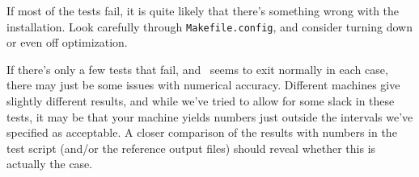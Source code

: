 If most of the tests fail, it is quite likely that there's something
wrong with the installation. Look carefully through
\verb|Makefile.config|, and consider turning down or even off
optimization.

If there's only a few tests that fail, and \dalton\ seems to exit
normally in each case, there may just be some issues with numerical
accuracy. Different machines give slightly different results, and
while we've tried to allow for some slack in these tests, it may be
that your machine yields numbers just outside the intervals we've
specified as acceptable. A closer comparison of the results with
numbers in the test script (and/or the reference output files) should
reveal whether this is actually the case.
